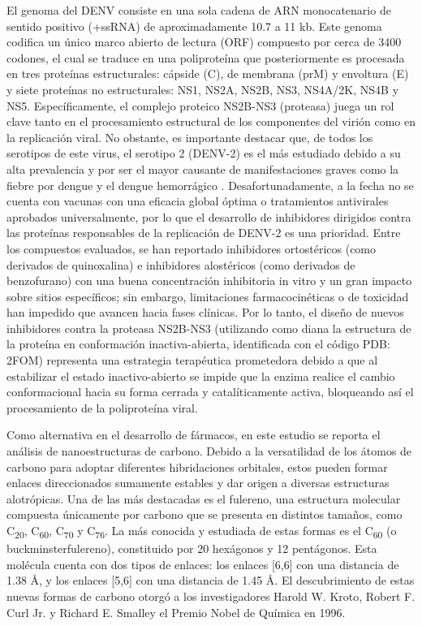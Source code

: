 El genoma del DENV consiste en una sola cadena de ARN monocatenario de sentido positivo (+ssRNA) de aproximadamente 10.7 a 11 kb. Este genoma codifica un único marco abierto de lectura (ORF) compuesto por cerca de 3400 codones, el cual se traduce en una poliproteína que posteriormente es procesada en tres proteínas estructurales: cápside (C), de membrana (prM) y envoltura (E) y siete proteínas no estructurales: NS1, NS2A, NS2B, NS3, NS4A/2K, NS4B y NS5. Específicamente, el complejo proteico NS2B-NS3 (proteasa) juega un rol clave tanto en el procesamiento estructural de los componentes del virión como en la replicación viral. No obstante, es importante destacar que, de todos los serotipos de este virus, el serotipo 2 (DENV-2) es el más estudiado debido a su alta prevalencia y por ser el mayor causante de manifestaciones graves como la fiebre por dengue y el dengue hemorrágico \cite{contreras2021aspectos}. Desafortunadamente, a la fecha no se cuenta con vacunas con una eficacia global óptima o tratamientos antivirales aprobados universalmente, por lo que el desarrollo de inhibidores dirigidos contra las proteínas responsables de la replicación de DENV-2 es una prioridad. Entre los compuestos evaluados, se han reportado inhibidores ortostéricos (como derivados de quinoxalina) e inhibidores alostéricos (como derivados de benzofurano) con una buena concentración inhibitoria in vitro y un gran impacto sobre sitios específicos; sin embargo, limitaciones farmacocinéticas o de toxicidad han impedido que avancen hacia fases clínicas. Por lo tanto, el diseño de nuevos inhibidores contra la proteasa NS2B-NS3 (utilizando como diana la estructura de la proteína en conformación inactiva-abierta, identificada con el código PDB: 2FOM) representa una estrategia terapéutica prometedora debido a que al estabilizar el estado inactivo-abierto se impide que la enzima realice el cambio conformacional hacia su forma cerrada y catalíticamente activa, bloqueando así el procesamiento de la poliproteína viral. 

Como alternativa en el desarrollo de fármacos, en este estudio se reporta el análisis de nanoestructuras de carbono. Debido a la versatilidad de los átomos de carbono para adoptar diferentes hibridaciones orbitales, estos pueden formar enlaces direccionados sumamente estables y dar origen a diversas estructuras alotrópicas. Una de las más destacadas es el fulereno, una estructura molecular compuesta únicamente por carbono que se presenta en distintos tamaños, como C\textsubscript{20}, C\textsubscript{60}, C\textsubscript{70} y C\textsubscript{76}. La más conocida y estudiada de estas formas es el C\textsubscript{60} (o buckminsterfulereno), constituido por 20 hexágonos y 12 pentágonos. Esta molécula cuenta con dos tipos de enlaces: los enlaces [6,6] con una distancia de 1.38 Å, y los enlaces [5,6] con una distancia de 1.45 Å. \cite{fajardo2012dengue} El descubrimiento de estas nuevas formas de carbono otorgó a los investigadores Harold W. Kroto, Robert F. Curl Jr. y Richard E. Smalley el Premio Nobel de Química en 1996.

